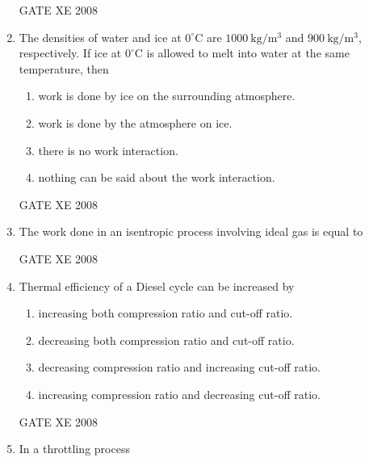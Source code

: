 \documentclass[12pt]{article}
\begin{document}
\begin{enumerate}[label=Q\arabic*.]
GATE XE 2008

\item The densities of water and ice at $0^\circ$C are $1000\ \mathrm{kg/m^3}$ and $900\ \mathrm{kg/m^3}$, respectively. If ice at $0^\circ$C is allowed to melt into water at the same temperature, then  

\begin{enumerate}[label=(\Alph*)]
\item  work is done by ice on the surrounding atmosphere. 
\item  work is done by the atmosphere on ice. 
\item  there is no work interaction. 
\item  nothing can be said about the work interaction.  
\end{enumerate}

GATE XE 2008

\item The work done in an isentropic process involving ideal gas is equal to  

\begin{enumerate}[label=(\Alph*)]
\end{enumerate}

GATE XE 2008

\item Thermal efficiency of a Diesel cycle can be increased by  

\begin{enumerate}[label=(\Alph*)]
\item  increasing both compression ratio and cut-off ratio. 
\item  decreasing both compression ratio and cut-off ratio. 
\item  decreasing compression ratio and increasing cut-off ratio. 
\item  increasing compression ratio and decreasing cut-off ratio.  
\end{enumerate}

GATE XE 2008

\item In a throttling process  


\end{enumerate}
\end{document}
